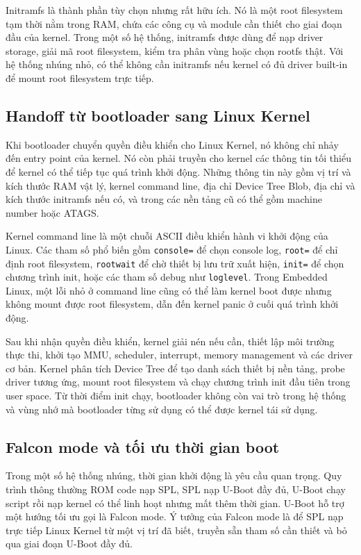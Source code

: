 \documentclass[11pt]{article}
\newcommand{\code}[1]{\texttt{#1}}
\begin{document}
Initramfs là thành phần tùy chọn nhưng rất hữu ích. Nó là một root filesystem tạm thời nằm trong RAM, chứa các công cụ và module cần thiết cho giai đoạn đầu của kernel. Trong một số hệ thống, initramfs được dùng để nạp driver storage, giải mã root filesystem, kiểm tra phân vùng hoặc chọn rootfs thật. Với hệ thống nhúng nhỏ, có thể không cần initramfs nếu kernel có đủ driver built-in để mount root filesystem trực tiếp.

\subsection{Handoff từ bootloader sang Linux Kernel}

Khi bootloader chuyển quyền điều khiển cho Linux Kernel, nó không chỉ nhảy đến entry point của kernel. Nó còn phải truyền cho kernel các thông tin tối thiểu để kernel có thể tiếp tục quá trình khởi động. Những thông tin này gồm vị trí và kích thước RAM vật lý, kernel command line, địa chỉ Device Tree Blob, địa chỉ và kích thước initramfs nếu có, và trong các nền tảng cũ có thể gồm machine number hoặc ATAGS.

Kernel command line là một chuỗi ASCII điều khiển hành vi khởi động của Linux. Các tham số phổ biến gồm \code{console=} để chọn console log, \code{root=} để chỉ định root filesystem, \code{rootwait} để chờ thiết bị lưu trữ xuất hiện, \code{init=} để chọn chương trình init, hoặc các tham số debug như \code{loglevel}. Trong Embedded Linux, một lỗi nhỏ ở command line cũng có thể làm kernel boot được nhưng không mount được root filesystem, dẫn đến kernel panic ở cuối quá trình khởi động.

Sau khi nhận quyền điều khiển, kernel giải nén nếu cần, thiết lập môi trường thực thi, khởi tạo MMU, scheduler, interrupt, memory management và các driver cơ bản. Kernel phân tích Device Tree để tạo danh sách thiết bị nền tảng, probe driver tương ứng, mount root filesystem và chạy chương trình init đầu tiên trong user space. Từ thời điểm init chạy, bootloader không còn vai trò trong hệ thống và vùng nhớ mà bootloader từng sử dụng có thể được kernel tái sử dụng.

\subsection{Falcon mode và tối ưu thời gian boot}

Trong một số hệ thống nhúng, thời gian khởi động là yêu cầu quan trọng. Quy trình thông thường ROM code nạp SPL, SPL nạp U-Boot đầy đủ, U-Boot chạy script rồi nạp kernel có thể linh hoạt nhưng mất thêm thời gian. U-Boot hỗ trợ một hướng tối ưu gọi là Falcon mode. Ý tưởng của Falcon mode là để SPL nạp trực tiếp Linux Kernel từ một vị trí đã biết, truyền sẵn tham số cần thiết và bỏ qua giai đoạn U-Boot đầy đủ.
\end{document}
